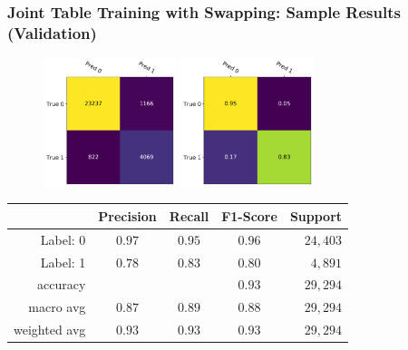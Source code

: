 \documentclass[usenames,dvipsnames]{beamer}
\begin{document}
\begin{frame}
  \frametitle{Joint Table Training with Swapping: Sample Results (Validation)}
  \begin{figure}
    \centering
    \includegraphics[height=3.75cm, valign=c]{assets/swap_cm_table_test}
    \includegraphics[height=3.75cm, valign=c]{assets/swap_cm_table_norm_test}
  \end{figure}
  \begin{center}
    \begin{tabular}{rcccr}
    \toprule
    {} &  Precision &  Recall &  F1-Score & Support \\
    \midrule
    Label: 0 & $0.97$ & $0.95$ & $0.96$ & $24,403$ \\
    Label: 1 & $0.78$ & $0.83$ & $0.80$ & $4,891$ \\
    \midrule
    accuracy & {} & {} & $0.93$ & $29,294$ \\
    macro avg & $0.87$ & $0.89$ & $0.88$ & $29,294$ \\
    weighted avg & $0.93$ & $0.93$ & $0.93$ & $29,294$ \\
    \bottomrule
    \end{tabular}
  \end{center}
\end{frame}
\end{document}
